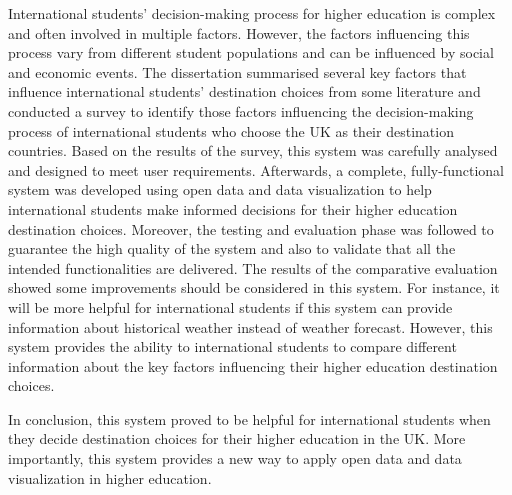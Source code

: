 International students’ decision-making process for higher education is complex and often involved in multiple factors. However, the factors influencing this process vary from different student populations and can be influenced by social and economic events. The dissertation summarised several key factors that influence international students’ destination choices from some literature and conducted a survey to identify those factors influencing the decision-making process of international students who choose the UK as their destination countries. Based on the results of the survey, this system was carefully analysed and designed to meet user requirements. Afterwards, a complete, fully-functional system was developed using open data and data visualization to help international students make informed decisions for their higher education destination choices.  Moreover, the testing and evaluation phase was followed to guarantee the high quality of the system and also to validate that all the intended functionalities are delivered. The results of the comparative evaluation showed some improvements should be considered in this system. For instance, it will be more helpful for international students if this system can provide information about historical weather instead of weather forecast. However, this system provides the ability to international students to compare different information about the key factors influencing their higher education destination choices. 

In conclusion, this system proved to be helpful for international students when they decide destination choices for their higher education in the UK. More importantly, this system provides a new way to apply open data and data visualization in higher education.

